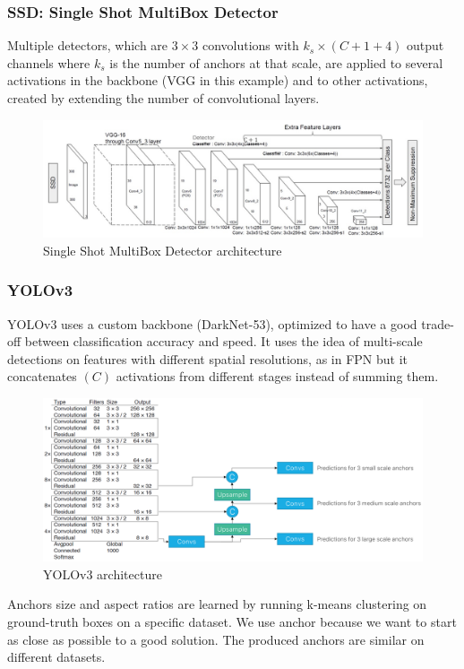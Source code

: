 \subsubsection{SSD: Single Shot MultiBox Detector}
Multiple detectors, which are $3\times 3$ convolutions with $k_s \times (C + 1 + 4)$ output channels where $k_s$ is the number of anchors at that scale, are applied to several activations in the backbone (VGG in this example) and to other activations, created by extending the number of convolutional layers.

\begin{figure}[htbp]
  \centering
  \includegraphics[width=0.9\linewidth]{./img/ssd.jpg}
  \caption{Single Shot MultiBox Detector architecture}
\end{figure}

\subsubsection{YOLOv3}

YOLOv3 uses a custom backbone (DarkNet-53), optimized to have a good trade-off between classification accuracy and speed.
It uses the idea of multi-scale detections on features with different spatial resolutions, as in FPN but it concatenates $(C)$ activations from different stages instead of summing them.

\begin{figure}[htbp]
  \centering
  \includegraphics[width=0.9\linewidth]{./img/yolov3.png}
  \caption{YOLOv3 architecture}
\end{figure}

Anchors size and aspect ratios are learned by running k-means clustering on ground-truth boxes on a specific dataset.
We use anchor because we want to start as close as possible to a good solution.
The produced anchors are similar on different datasets.

